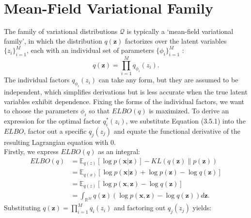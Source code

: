 \documentclass[honours,12pt]{unswthesis}
\newcommand{\R}{\mathbb{R}}
\numberwithin{equation}{section}
\theoremstyle{definition}
\begin{document}
\section{Mean-Field Variational Family}\label{sec:3.5}
The family of variational distributions $\mathcal{Q}$ is typically a `mean-field variational family', in which the distribution $q(\bm{z})$ factorizes over the latent variables $\{z_i\}^M_{i=1}$, each with an individual set of parameters $\{\phi_i\}^M_{i=1}$ \citep{blei}:
\begin{equation}
q(\bm{z})=\prod^M_{i=1}q_{\phi_i}(z_i).
\end{equation}
The individual factors $q_{\phi_i}(z_i)$ can take any form, but they are assumed to be independent, which simplifies derivations but is less accurate when the true latent variables exhibit dependence. Fixing the forms of the individual factors, we want to choose the parameters $\phi_i$ so that $ELBO(q)$ is maximized. To derive an expression for the optimal factor $q_i^*(z_i)$, we substitute Equation (3.5.1) into the $ELBO$, factor out a specific $q_j(z_j)$ and equate the functional derivative of the resulting Lagrangian equation with 0. \\
Firstly, we express $ELBO(q)$ as an integral:
\begin{align*}
ELBO(q)&= \mathbb{E}_{q(z)}[\log p(\bm{x}|\bm{z})]-KL(q(\bm{z})\|p(\bm{z}))\\
&= \mathbb{E}_{q(x)}[\log p(\bm{x}|\bm{z})+\log p(\bm{z})-\log q(\bm{z})]\\
&= \mathbb{E}_{q(z)}[\log p(\bm{x}, \bm{z})-\log q(\bm{z})]\\
&= \int_{\R^M}q(\bm{z})(\log p(\bm{x},\bm{z})-\log q(\bm{z}))d\bm{z}.
\end{align*}
Substituting $q(\bm{z})=\prod^M_{i=1}q_i(z_i)$ and factoring out $q_j(z_j)$ yields:
\end{document}
